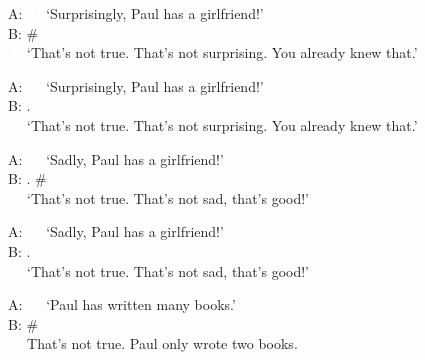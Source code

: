 \begin{exe}
\ex\label{ex:mirativitydgsnotatissuea}
A: 
\glt \textcolor{white}{A: }`Surprisingly, Paul has a girlfriend!' \\
B:  \#   \\

\textcolor{white}{A: }`That's not true. That's not surprising. You already knew that.'

\ex\label{ex:mirativitydgsnotatissueab}
A:   
\glt \textcolor{white}{A: }`Surprisingly, Paul has a girlfriend!' \\
B: .   \\
\textcolor{white}{A: }`That's not true. That's not surprising. You already knew that.'


\ex\label{ex:evaluationnotatissue}
A: 
\glt \textcolor{white}{A: }`Sadly, Paul has a girlfriend!'\label{ex:evaluationnotatissuea} \\
B: . \#  \\
\textcolor{white}{A: }`That's not true. That's not sad, that's good!'

\ex\label{ex:evaluationnotatissueb}
A: 
\glt \textcolor{white}{A: }`Sadly, Paul has a girlfriend!' \\
B: .    \\
\textcolor{white}{A: }`That's not true. That's not sad, that's good!'

\ex A:  
\glt \textcolor{white}{A: }`Paul has written many books.' \\
B:  \#\\
%
\textcolor{white}{A: }That's not true. Paul only wrote two books.


\end{exe}
